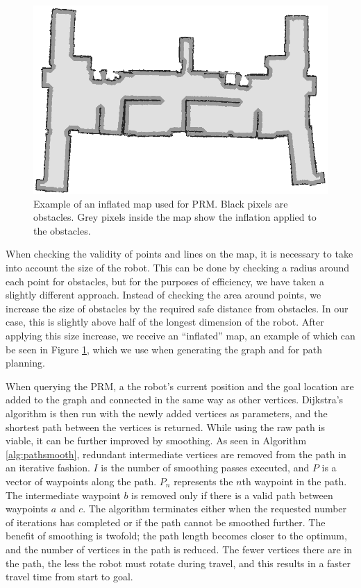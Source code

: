 \documentclass[conference]{IEEEtran}
\begin{document}
\begin{figure}
  \centering
  \includegraphics[width=\columnwidth]{inflated}
  \caption{Example of an inflated map used for PRM. Black pixels are obstacles. Grey pixels inside the map show the inflation applied to the obstacles.}
  \label{fig:inflatedmap}
\end{figure}
When checking the validity of points and lines on the map, it is necessary to take into account the size of the robot. This can be done by checking a radius around each point for obstacles, but for the purposes of efficiency, we have taken a slightly different approach. Instead of checking the area around points, we increase the size of obstacles by the required safe distance from obstacles. In our case, this is slightly above half of the longest dimension of the robot. After applying this size increase, we receive an ``inflated'' map, an example of which can be seen in Figure \ref{fig:inflatedmap}, which we use when generating the graph and for path planning.

When querying the PRM, a the robot's current position and the goal location are added to the graph and connected in the same way as other vertices. Dijkstra's algorithm is then run with the newly added vertices as parameters, and the shortest path between the vertices is returned. While using the raw path is viable, it can be further improved by smoothing. As seen in Algorithm \ref{alg:pathsmooth}, redundant intermediate vertices are removed from the path in an iterative fashion. $I$ is the number of smoothing passes executed, and $P$ is a vector of waypoints along the path. $P_n$ represents the $n$th waypoint in the path. The intermediate waypoint $b$ is removed only if there is a valid path between waypoints $a$ and $c$. The algorithm terminates either when the requested number of iterations has completed or if the path cannot be smoothed further. The benefit of smoothing is twofold; the path length becomes closer to the optimum, and the number of vertices in the path is reduced. The fewer vertices there are in the path, the less the robot must rotate during travel, and this results in a faster travel time from start to goal.
\end{document}
